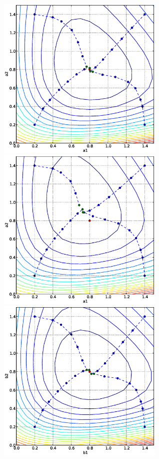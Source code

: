 \begin{figure}
  \begin{center}
    \includegraphics[width=8cm]{chapters/schroll/eps/a1a2scan4.eps}
    \includegraphics[width=8cm]{chapters/schroll/eps/a1a2scan4-5.eps}
    \includegraphics[width=8cm]{chapters/schroll/eps/b1b2scan4.eps}

\end{center}
\end{figure}
